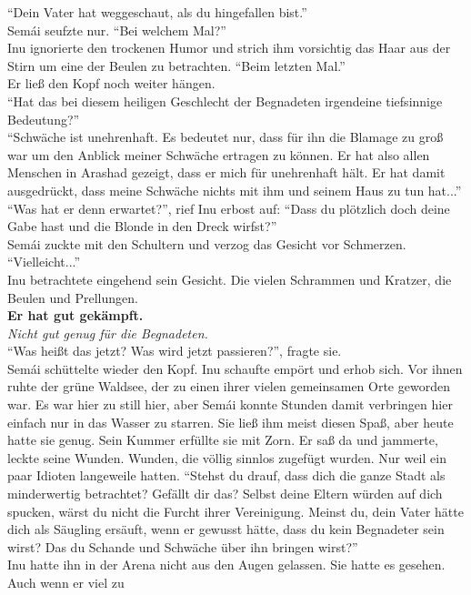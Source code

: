``Dein Vater hat weggeschaut, als du hingefallen bist.''\\
Semái seufzte nur. ``Bei welchem Mal?''\\
Inu ignorierte den trockenen Humor und strich ihm vorsichtig das Haar aus der Stirn um eine der 
Beulen zu betrachten. ``Beim letzten Mal.''\\
Er ließ den Kopf noch weiter hängen. \\
``Hat das bei diesem heiligen Geschlecht der Begnadeten irgendeine tiefsinnige Bedeutung?''\\
``Schwäche ist unehrenhaft. Es bedeutet nur, dass für ihn die Blamage zu groß war um den Anblick 
meiner Schwäche ertragen zu können. Er hat also allen Menschen in Arashad gezeigt, dass er mich für 
unehrenhaft hält. Er hat damit ausgedrückt, dass meine Schwäche nichts mit ihm und seinem Haus zu 
tun hat...''\\
``Was hat er denn erwartet?'', rief Inu erbost auf: ``Dass du plötzlich doch deine Gabe hast und 
die Blonde in den Dreck wirfst?''\\
Semái zuckte mit den Schultern und verzog das Gesicht vor Schmerzen. ``Vielleicht...''\\
Inu betrachtete eingehend sein Gesicht. Die vielen Schrammen und Kratzer, die Beulen und 
Prellungen.\\
\textbf{Er hat gut gekämpft.}\\
\textit{Nicht gut genug für die Begnadeten.}\\
``Was heißt das jetzt? Was wird jetzt passieren?'', fragte sie.\\
Semái schüttelte wieder den Kopf. Inu schaufte empört und erhob sich. Vor ihnen ruhte der grüne 
Waldsee, der zu einen ihrer vielen gemeinsamen Orte geworden war. Es war hier zu still hier, aber 
Semái konnte Stunden damit verbringen hier einfach nur in das Wasser zu starren. Sie ließ ihm meist 
diesen Spaß, aber heute hatte sie genug. Sein Kummer erfüllte sie mit Zorn. Er saß da und jammerte, 
leckte seine Wunden. Wunden, die völlig sinnlos zugefügt wurden. Nur weil ein paar Idioten 
langeweile hatten. ``Stehst du drauf, dass dich die ganze Stadt als minderwertig betrachtet? 
Gefällt dir das? Selbst deine Eltern würden auf dich spucken, wärst du nicht die Furcht ihrer 
Vereinigung. Meinst du, dein Vater hätte dich als Säugling ersäuft, wenn er gewusst hätte, dass du 
kein Begnadeter sein wirst? Das du Schande und Schwäche über ihn bringen wirst?''\\
Inu hatte ihn in der Arena nicht aus den Augen gelassen. Sie hatte es gesehen. Auch wenn er viel zu 
